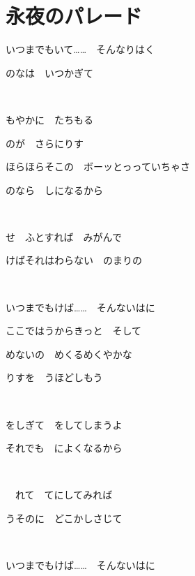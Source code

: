 \section{永夜のパレード}

いつまでもいて……　そんなりはく

のなは　いつかぎて

~

もやかに　たちもる

のが　さらにりす

ほらほらそこの　ボーッとっっていちゃさ

のなら　しになるから

~

せ　ふとすれば　みがんで

けばそれはわらない　のまりの

~

いつまでもけば……　そんないはに

ここではうからきっと　そして

めないの　めくるめくやかな

りすを　うほどしもう

~

をしぎて　をしてしまうよ

それでも　によくなるから

~

　れて　てにしてみれば

うそのに　どこかしさじて

~

いつまでもけば……　そんないはに

